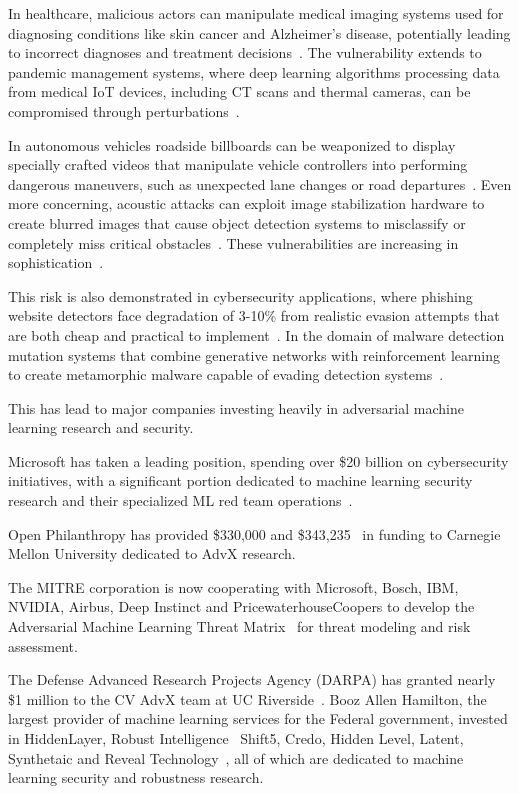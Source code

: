 \documentclass[a4paper, oneside]{discothesis}
\begin{document}
In healthcare, malicious actors can manipulate medical imaging systems used for diagnosing conditions like skin cancer and Alzheimer's disease, potentially leading to incorrect diagnoses and treatment decisions~\cite{jogani2022analysis, najafi2024dft}. The vulnerability extends to pandemic management systems, where deep learning algorithms processing data from medical IoT devices, including CT scans and thermal cameras, can be compromised through perturbations~\cite{9154468}.

In autonomous vehicles roadside billboards can be weaponized to display specially crafted videos that manipulate vehicle controllers into performing dangerous maneuvers, such as unexpected lane changes or road departures~\cite{Patel2019AdaptiveAV}. Even more concerning, acoustic attacks can exploit image stabilization hardware to create blurred images that cause object detection systems to misclassify or completely miss critical obstacles~\cite{Ji2021PoltergeistAA}. These vulnerabilities are increasing in sophistication~\cite{Axelrod2017CybersecurityCO}.

This risk is also demonstrated in cybersecurity applications, where phishing website detectors face degradation of 3-10\% from realistic evasion attempts that are both cheap and practical to implement~\cite{Yuan2023MultiSpacePhishET}. In the domain of malware detection mutation systems that combine generative networks with reinforcement learning to create metamorphic malware capable of evading detection systems~\cite{to2023effectiveness}.

This has lead to major companies investing heavily in adversarial machine learning research and security.

Microsoft has taken a leading position, spending over \$20 billion on cybersecurity initiatives, with a significant portion dedicated to machine learning security research and their specialized ML red team operations~\cite{coursera_adversarial_2024}.

Open Philanthropy has provided \$330,000 and \$343,235~\cite{openphil2024adversarial} in funding to Carnegie Mellon University dedicated to AdvX research.

The MITRE corporation is now cooperating with Microsoft, Bosch, IBM, NVIDIA, Airbus, Deep Instinct and PricewaterhouseCoopers to develop the Adversarial Machine Learning Threat Matrix~\cite{mitre2024ml} for threat modeling and risk assessment.

The Defense Advanced Research Projects Agency (DARPA) has granted nearly \$1 million to the CV AdvX team at UC Riverside~\cite{roy2020darpa}.
Booz Allen Hamilton, the largest provider of machine learning services for the Federal government, invested in HiddenLayer, Robust Intelligence~\cite{robustintelligence2024, cai2020robust} Shift5, Credo, Hidden Level, Latent, Synthetaic and Reveal Technology~\cite{boozallen2023adversarial, boozallen2023adversarialother}, all of which are dedicated to machine learning security and robustness research.
\end{document}
